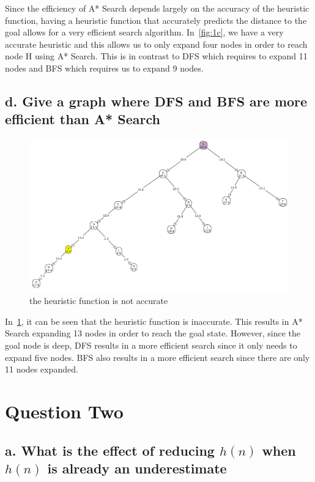 \documentclass[11pt, A4]{article}
\begin{document}
Since the efficiency of A* Search depends largely on the accuracy of the heuristic function, having a heuristic function that accurately predicts the distance to the goal allows for a very efficient search algorithm. In~\ref{fig:1c}, we have a very accurate heuristic and this allows us to only expand four nodes in order to reach node H using A* Search. This is in contrast to DFS which requires to expand 11 nodes and BFS which requires us to expand 9 nodes.  

\subsection*{d. Give a graph where DFS and BFS are more efficient than A* Search}

\begin{figure}[H]
\centering
\includegraphics[width = \textwidth]{./1d.png}
\caption{the heuristic function is not accurate}
\label{fig:1d}
\end{figure}

In~\ref{fig:1d}, it can be seen that the heuristic function is inaccurate. This results in A* Search expanding 13 nodes in order to reach the goal state. However, since the goal node is deep, DFS results in a more efficient search since it only needs to expand five nodes. BFS also results in a more efficient search since there are only 11 nodes expanded. 

\newpage
\section*{Question Two}

\subsection*{a. What is the effect of reducing $h(n)$ when $h(n)$ is already an underestimate}
\end{document}
